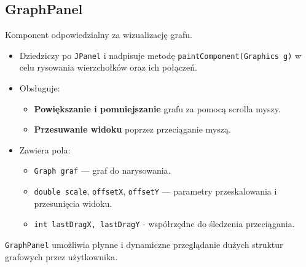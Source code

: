 \documentclass[a4paper,12pt]{article}
\begin{document}
\subsection*{GraphPanel}
Komponent odpowiedzialny za wizualizację grafu.
\begin{itemize}
  \item Dziedziczy po \texttt{JPanel} i nadpisuje metodę \texttt{paintComponent(Graphics g)} w celu rysowania wierzchołków oraz ich połączeń.
  \item Obsługuje:
    \begin{itemize}
        \item \textbf{Powiększanie i pomniejszanie} grafu za pomocą scrolla myszy.
        \item \textbf{Przesuwanie widoku} poprzez przeciąganie myszą.
    \end{itemize}
   \item Zawiera pola:
    \begin{itemize}
        \item \texttt{Graph graf} --- graf do narysowania.
        \item \texttt{double scale}, \texttt{offsetX}, \texttt{offsetY} --- parametry przeskalowania i przesunięcia widoku.
        \item \texttt{int lastDragX, lastDragY} - współrzędne do śledzenia przeciągania.
    \end{itemize}
\end{itemize}
\texttt{GraphPanel} umożliwia płynne i dynamiczne przeglądanie dużych struktur grafowych przez użytkownika.
\end{document}
